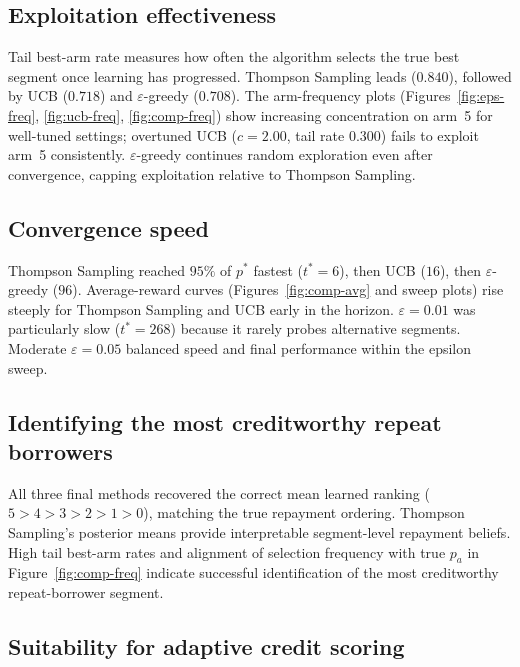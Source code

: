 \documentclass[11pt,a4paper]{article}
\begin{document}
\subsection{Exploitation effectiveness}

Tail best-arm rate measures how often the algorithm selects the true best segment once learning has progressed. Thompson Sampling leads ($0.840$), followed by UCB ($0.718$) and $\varepsilon$-greedy ($0.708$). The arm-frequency plots (Figures~\ref{fig:eps-freq}, \ref{fig:ucb-freq}, \ref{fig:comp-freq}) show increasing concentration on arm~5 for well-tuned settings; overtuned UCB ($c{=}2.00$, tail rate $0.300$) fails to exploit arm~5 consistently. $\varepsilon$-greedy continues random exploration even after convergence, capping exploitation relative to Thompson Sampling.

\subsection{Convergence speed}

Thompson Sampling reached $95\%$ of $p^\ast$ fastest ($t^\ast{=}6$), then UCB ($16$), then $\varepsilon$-greedy ($96$). Average-reward curves (Figures~\ref{fig:comp-avg} and sweep plots) rise steeply for Thompson Sampling and UCB early in the horizon. $\varepsilon{=}0.01$ was particularly slow ($t^\ast{=}268$) because it rarely probes alternative segments. Moderate $\varepsilon{=}0.05$ balanced speed and final performance within the epsilon sweep.

\subsection{Identifying the most creditworthy repeat borrowers}

All three final methods recovered the correct mean learned ranking ($5 > 4 > 3 > 2 > 1 > 0$), matching the true repayment ordering. Thompson Sampling's posterior means provide interpretable segment-level repayment beliefs. High tail best-arm rates and alignment of selection frequency with true $p_a$ in Figure~\ref{fig:comp-freq} indicate successful identification of the most creditworthy repeat-borrower segment.

\subsection{Suitability for adaptive credit scoring}
\end{document}
